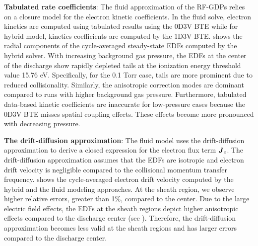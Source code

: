 \textbf{Tabulated rate coefficients}: The fluid approximation of the RF-GDPs relies on a closure model for the electron kinetic coefficients. In the fluid solve, electron kinetics are computed using tabulated results using the 0D3V BTE while for hybrid model, kinetics coefficients are computed by the 1D3V BTE. 
 shows the radial components of the cycle-averaged steady-state EDFs computed by the hybrid solver. With increasing background gas pressure, the EDFs at the center of the discharge show rapidly depleted tails at the ionization energy threshold value 15.76 eV. Specifically, for the 0.1 Torr case, tails are more prominent due to reduced collisionality. Similarly, the anisotropic correction modes are dominant compared to runs with higher background gas pressure. Furthermore, tabulated data-based kinetic coefficients
are inaccurate for low-pressure cases because the 0D3V BTE misses spatial coupling effects. These effects become more pronounced with decreasing pressure. 

\textbf{The drift-diffusion approximation}: 
The fluid model uses the drift-diffusion approximation to derive a closed expression for the electron flux term $\boldsymbol{J}_e$. The drift-diffusion approximation assumes that the EDFs are isotropic and electron drift velocity is negligible compared to the collisional momentum transfer frequency.  shows the cycle-averaged electron drift velocity computed by the hybrid and the fluid modeling approaches. At the sheath region, we observe higher relative errors, greater than 1\%, compared to the center. Due to the large electric field effects, the EDFs at the sheath regions depict higher anisotropic effects compared to the discharge center (see ). Therefore, the drift-diffusion approximation becomes less valid at the sheath regions and has larger errors compared to the discharge center.   

